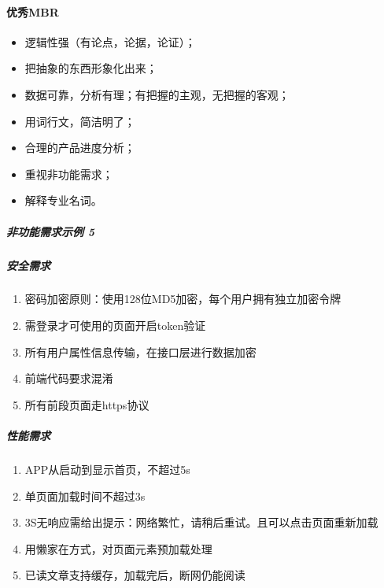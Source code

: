 \documentclass[letterpaper,11pt,english]{sphinxmanual}
\begin{document}
\paragraph{优秀MBR}
\label{\detokenize{chapter_knowledge/MRD:mbr}}\begin{itemize}
\item {} 
逻辑性强（有论点，论据，论证）；

\item {} 
把抽象的东西形象化出来；

\item {} 
数据可靠，分析有理；有把握的主观，无把握的客观；

\item {} 
用词行文，简洁明了；

\item {} 
合理的产品进度分析；

\item {} 
重视非功能需求；

\item {} 
解释专业名词。

\end{itemize}


\subparagraph{非功能需求示例 5\sphinxfootnotemark[486]}
\label{\detokenize{chapter_knowledge/MRD:id5}}%
\begin{footnotetext}[486]\sphinxAtStartFootnote
{}
%
\end{footnotetext}\ignorespaces 

\subparagraph{安全需求}
\label{\detokenize{chapter_knowledge/MRD:id6}}\begin{enumerate}
%
\item {} 
密码加密原则：使用128位MD5加密，每个用户拥有独立加密令牌

\item {} 
需登录才可使用的页面开启token验证

\item {} 
所有用户属性信息传输，在接口层进行数据加密

\item {} 
前端代码要求混淆

\item {} 
所有前段页面走https协议

\end{enumerate}


\subparagraph{性能需求}
\label{\detokenize{chapter_knowledge/MRD:id7}}\begin{enumerate}
%
\item {} 
APP从启动到显示首页，不超过5s

\item {} 
单页面加载时间不超过3s

\item {} 
3S无响应需给出提示：网络繁忙，请稍后重试。且可以点击页面重新加载

\item {} 
用懒家在方式，对页面元素预加载处理

\item {} 
已读文章支持缓存，加载完后，断网仍能阅读

\end{enumerate}
\end{document}
